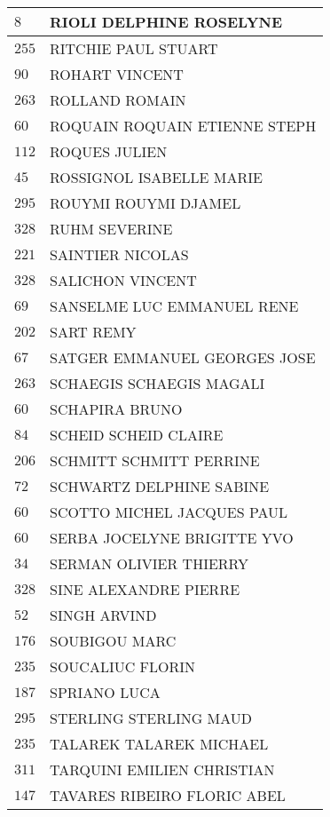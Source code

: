 \begin{xltabular}{\linewidth}{|l|X|}
    \hline
    $8$ & RIOLI DELPHINE ROSELYNE \\
    \hline
    $255$ & RITCHIE PAUL STUART \\
    \hline
    $90$ & ROHART VINCENT \\
    \hline
    $263$ & ROLLAND ROMAIN \\
    \hline
    $60$ & ROQUAIN ROQUAIN ETIENNE STEPH \\
    \hline
    $112$ & ROQUES JULIEN \\
    \hline
    $45$ & ROSSIGNOL ISABELLE MARIE \\
    \hline
    $295$ & ROUYMI ROUYMI DJAMEL \\
    \hline
    $328$ & RUHM SEVERINE \\
    \hline
    $221$ & SAINTIER NICOLAS \\
    \hline
    $328$ & SALICHON VINCENT \\
    \hline
    $69$ & SANSELME LUC EMMANUEL RENE \\
    \hline
    $202$ & SART REMY \\
    \hline
    $67$ & SATGER EMMANUEL GEORGES JOSE \\
    \hline
    $263$ & SCHAEGIS SCHAEGIS MAGALI \\
    \hline
    $60$ & SCHAPIRA BRUNO \\
    \hline
    $84$ & SCHEID SCHEID CLAIRE \\
    \hline
    $206$ & SCHMITT SCHMITT PERRINE \\
    \hline
    $72$ & SCHWARTZ DELPHINE SABINE \\
    \hline
    $60$ & SCOTTO MICHEL JACQUES PAUL \\
    \hline
    $60$ & SERBA JOCELYNE BRIGITTE YVO \\
    \hline
    $34$ & SERMAN OLIVIER THIERRY \\
    \hline
    $328$ & SINE ALEXANDRE PIERRE \\
    \hline
    $52$ & SINGH ARVIND \\
    \hline
    $176$ & SOUBIGOU MARC \\
    \hline
    $235$ & SOUCALIUC FLORIN \\
    \hline
    $187$ & SPRIANO LUCA \\
    \hline
    $295$ & STERLING STERLING MAUD \\
    \hline
    $235$ & TALAREK TALAREK MICHAEL \\
    \hline
    $311$ & TARQUINI EMILIEN CHRISTIAN \\
    \hline
    $147$ & TAVARES RIBEIRO FLORIC ABEL \\

\end{xltabular}
